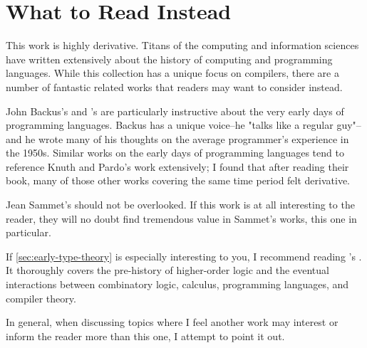\chapter{What to Read Instead}

This work is highly derivative.
Titans of the computing and information sciences have written extensively
about the history of computing and programming languages.
While this collection has a unique focus on compilers, there are a number
of fantastic related works that readers may want to consider instead.

John Backus's 
and \citeauthor{Knuth_TrabbPardo_1976_Early_Development}'s
 are particularly instructive
about the very early days of programming languages.
Backus has a unique voice--he "talks like a regular guy"--and he wrote many of
his thoughts on the average programmer's experience in the 1950s.
Similar works on the early days of programming languages tend to reference
Knuth and Pardo's work extensively; I found that after reading their book,
many of those other works covering the same time period felt derivative.

Jean Sammet's 
should not be overlooked. If this work is at all interesting to the reader, they
will no doubt find tremendous value in Sammet's works, this one in particular.

If \cref{sec:early-type-theory} is especially interesting to you,
I recommend reading \citeauthor{cardone_hindley_history_of_lambda_calcl_2006}'s
.
It thoroughly covers the pre-history of higher-order logic and the
eventual interactions between combinatory logic, \textlambda calculus,
programming languages, and compiler theory.

In general, when discussing topics where I feel another work may interest or
inform the reader more than this one, I attempt to point it out.
